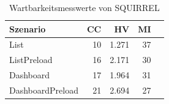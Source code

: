 \begin{table}[ht]
\centering
\caption{Wartbarkeitsmesswerte von SQUIRREL}
\begin{tabular}{lrrrr}
\toprule
Szenario & CC & HV & MI \\
\midrule
	List & 10 & 1.271 & 37 \\
	ListPreload & 16 & 2.171 & 30 \\
	Dashboard & 17 & 1.964 & 31 \\
	DashboardPreload & 21 & 2.694 & 27 \\
\bottomrule
\end{tabular}
\label{tab:wartbarkeit_squirrel}
\end{table}
	